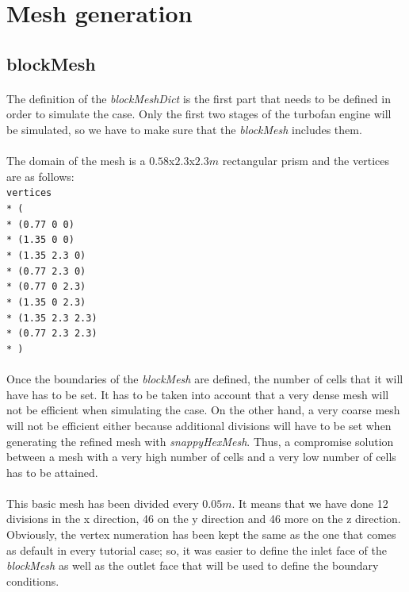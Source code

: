 \section{Mesh generation}

\subsection{blockMesh}
\paragraph{}The definition of the \textit{blockMeshDict} is the first part that needs to be defined in order to simulate the case. 
Only the first two stages of the turbofan engine will be simulated, so we have to make sure that the \textit{blockMesh} includes them.
\paragraph{}The domain of the mesh is a $0.58$x$2.3$x$2.3m$ rectangular prism and the vertices are as follows:\\
\texttt{\small{vertices\\*
(\\*
    (0.77 0   0)\\*
    (1.35 0   0)\\*
    (1.35 2.3 0)\\*
    (0.77 2.3 0)\\*
    (0.77 0   2.3)\\*
    (1.35 0   2.3)\\*
    (1.35 2.3 2.3)\\*
    (0.77 2.3 2.3)\\*
)
	}
}

\paragraph{}Once the boundaries of the \textit{blockMesh} are defined, the number of cells that it will have has to be set. It has to be taken into account that a very dense mesh will not be efficient when simulating the case. On the other hand, a very coarse mesh will not be efficient either because additional divisions will have to be set when generating the refined mesh with \textit{snappyHexMesh}. Thus, a compromise solution between a mesh with a very high number of cells and a very low number of cells has to be attained.

\paragraph{}This basic mesh has been divided every $0.05m$. It means that we have done 12 divisions in the x direction, 46 on the y direction and 46 more on the z direction. Obviously, the vertex numeration has been kept the same as the one that comes as default in every tutorial case; so, it was easier to define the inlet face of the \textit{blockMesh} as well as the outlet face that will be used to define the boundary conditions.

